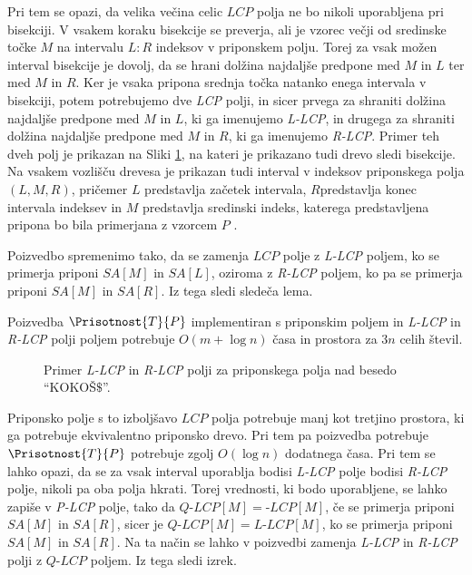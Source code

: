 Pri tem se opazi, da velika večina celic $LCP$ polja ne bo nikoli uporabljena pri bisekciji. V vsakem koraku bisekcije se preverja, ali je vzorec večji od sredinske točke $M$ na intervalu $L:R$ indeksov v priponskem polju. Torej za vsak možen interval bisekcije je dovolj, da se hrani dolžina najdaljše predpone med $M$ in $L$ ter med $M$ in $R$. Ker je vsaka pripona srednja točka natanko enega intervala v bisekciji, potem potrebujemo dve \textit{LCP} polji, in sicer prvega za shraniti dolžina najdaljše predpone med $M$ in $L$, ki ga imenujemo \textit{L-LCP}, in drugega za shraniti dolžina najdaljše predpone med $M$ in $R$, ki ga imenujemo \textit{R-LCP}. Primer teh dveh polj je prikazan na Sliki \ref{fig:RlcpLlcpSuffuxArray}, na kateri je prikazano tudi drevo sledi bisekcije. Na vsakem vozlišču drevesa je prikazan tudi interval v indeksov priponskega  polja $(L,M,R)$, pričemer $L$ predstavlja začetek intervala, $R$predstavlja konec intervala indeksev in $M$ predstavlja sredinski indeks, katerega predstavljena pripona bo bila primerjana z vzorcem $P$ \cite{Manber1990}. 

Poizvedbo spremenimo tako, da se zamenja $LCP$ polje z \textit{L-LCP} poljem, ko se primerja priponi $SA[M]$ in $SA[L]$, oziroma z \textit{R-LCP} poljem, ko pa se primerja priponi $SA[M]$ in $SA[R]$. Iz tega sledi sledeča lema.

\begin{lema}\label{lema:LRLCP}
    Poizvedba $\Prisotnost{T}{P}$ implementiran s priponskim poljem in \textit{L-LCP} in \textit{R-LCP} polji poljem potrebuje $O(m+\log{n})$ časa in prostora za $3n$ celih števil.
\end{lema}

\begin{figure}[tb] 
    
    \centering
    \caption{Primer \textit{L-LCP} in \textit{R-LCP} polji za priponskega polja nad besedo \enquote{KOKOŠ$\$$}.} 
    \label{fig:RlcpLlcpSuffuxArray}
\end{figure}

Priponsko polje s to izboljšavo $LCP$ polja potrebuje manj kot tretjino prostora, ki ga potrebuje ekvivalentno priponsko drevo. Pri tem pa poizvedba potrebuje $\Prisotnost{T}{P}$ potrebuje zgolj $O(\log{n})$ dodatnega časa. Pri tem se lahko opazi, da se za vsak interval uporablja bodisi \textit{L-LCP} polje bodisi \textit{R-LCP} polje, nikoli pa oba polja hkrati. Torej vrednosti, ki bodo uporabljene, se lahko zapiše v \textit{P-LCP} polje, tako da $\textit{Q-LCP}[M]= \textit{-LCP}[M]$, če se primerja priponi $SA[M]$ in $SA[R]$, sicer je $\textit{Q-LCP}[M]= \textit{L-LCP}[M]$, ko se primerja priponi $SA[M]$ in $SA[R]$. Na ta način se lahko v poizvedbi zamenja \textit{L-LCP} in \textit{R-LCP} polji z $\textit{Q-LCP}$ poljem. Iz tega sledi izrek.

